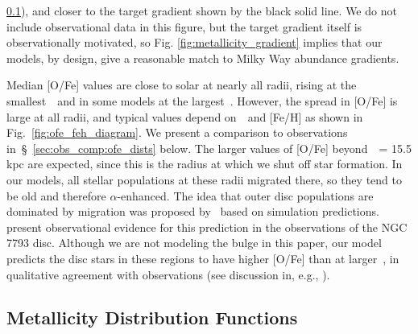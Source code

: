 \documentclass[draft2.tex]{subfiles}
\begin{document}
\ref{sec:obs_comp:mdfs}), and closer to the target gradient shown by the black 
solid line. We do not include observational data in this figure, but the target 
gradient itself is observationally motivated, so Fig. 
\ref{fig:metallicity_gradient} implies that our models, by design, give a 
reasonable match to Milky Way abundance gradients. 
\par 
Median [O/Fe] values are close to solar at nearly all radii, rising at the 
smallest~\rgal~and in some models at the largest~\rgal. However, the spread in 
[O/Fe] is large at all radii, and typical values depend on~\absz~and [Fe/H] as 
shown in Fig.~\ref{fig:ofe_feh_diagram}. 
We present a comparison to observations in~\S~\ref{sec:obs_comp:ofe_dists} 
below. 
The larger values of [O/Fe] beyond~\rgal~= 15.5 kpc are expected, since this is 
the radius at which we shut off star formation. In our models, all stellar 
populations at these radii migrated there, so they tend to be old and therefore 
$\alpha$-enhanced. 
The idea that outer disc populations are dominated by migration was proposed 
by~\citet{Roskar2008b} based on simulation predictions. 
\citet{RadburnSmith2012} present observational evidence for this prediction in 
the observations of the NGC 7793 disc. 
Although we are not modeling the bulge in this paper, our model predicts the 
disc stars in these regions to have higher [O/Fe] than at larger~\rgal, in 
qualitative agreement with observations (see discussion in, e.g., 
\citealp{Duong2019, Griffith2021}). 

\subsection{Metallicity Distribution Functions} 
\label{sec:obs_comp:mdfs} 
\end{document}
